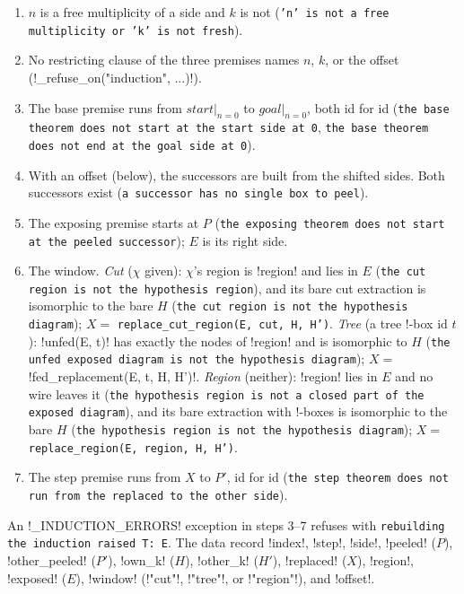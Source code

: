 \begin{enumerate}
\item $n$ is a free multiplicity of a side and $k$ is not (\texttt{'n' is not a free multiplicity or 'k' is not fresh}).
\item No restricting clause of the three premises names $n$, $k$, or the offset (\py!_refuse_on("induction", ...)!).
\item The base premise runs from $\mathit{start}|_{n=0}$ to $\mathit{goal}|_{n=0}$, both id for id (\texttt{the base theorem does not start at the start side at 0}, \texttt{the base theorem does not end at the goal side at 0}).
\item With an offset (below), the successors are built from the shifted sides. Both successors exist (\texttt{a successor has no single box to peel}).
\item The exposing premise starts at $P$ (\texttt{the exposing theorem does not start at the peeled successor}); $E$ is its right side.
\item The window. \emph{Cut} ($\chi$ given): $\chi$'s region is \code!region! and lies in $E$ (\texttt{the cut region is not the hypothesis region}), and its bare cut extraction is isomorphic to the bare $H$ (\texttt{the cut region is not the hypothesis diagram}); $X=$ \texttt{replace\_\allowbreak{}cut\_\allowbreak{}region(\allowbreak{}E,\allowbreak{} cut,\allowbreak{} H,\allowbreak{} H')}. \emph{Tree} (a tree !-box id $t$): \py!unfed(E, t)! has exactly the nodes of \code!region! and is isomorphic to $H$ (\texttt{the unfed exposed diagram is not the hypothesis diagram}); $X=$ \py!fed_replacement(E, t, H, H')!. \emph{Region} (neither): \code!region! lies in $E$ and no wire leaves it (\texttt{the hypothesis region is not a closed part of the exposed diagram}), and its bare extraction with !-boxes is isomorphic to the bare $H$ (\texttt{the hypothesis region is not the hypothesis diagram}); $X=$ \texttt{replace\_\allowbreak{}region(\allowbreak{}E,\allowbreak{} region,\allowbreak{} H,\allowbreak{} H')}.
\item The step premise runs from $X$ to $P'$, id for id (\texttt{the step theorem does not run from the replaced to the other side}).
\end{enumerate}
An \py!_INDUCTION_ERRORS! exception in steps 3--7 refuses with \texttt{rebuilding the induction raised T: E}. The data record \code!index!, \code!step!, \code!side!, \code!peeled! ($P$), \code!other_peeled! ($P'$), \code!own_k! ($H$), \code!other_k! ($H'$), \code!replaced! ($X$), \code!region!, \code!exposed! ($E$), \code!window! (\code!"cut"!, \code!"tree"!, or \code!"region"!), and \code!offset!.

